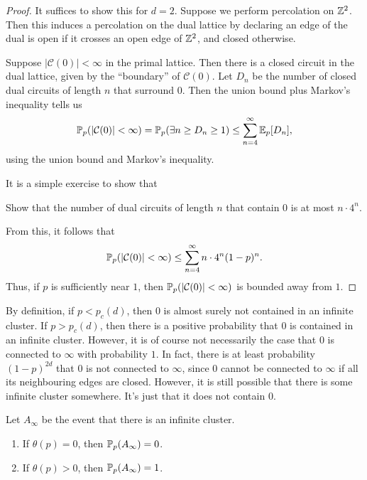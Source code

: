 \documentclass[a4paper]{article}
\begin{document}
\begin{proof}
  It suffices to show this for $d = 2$. Suppose we perform percolation on $\Z^2$. Then this induces a percolation on the dual lattice by declaring an edge of the dual is open if it crosses an open edge of $\Z^2$, and closed otherwise.

  Suppose $|\mathcal{C}(0)| < \infty$ in the primal lattice. Then there is a closed circuit in the dual lattice, given by the ``boundary'' of $\mathcal{C}(0)$. Let $D_n$ be the number of closed dual circuits of length $n$ that surround $0$. Then the union bound plus Markov's inequality tells us
  \[
    \P_p(|\mathcal{C}(0)| < \infty) = \P_p(\exists n \geq D_n \geq 1) \leq \sum_{n = 4}^\infty \E_p[D_n],
  \]
  using the union bound and Markov's inequality.

  It is a simple exercise to show that
  \begin{ex}
    Show that the number of dual circuits of length $n$ that contain $0$ is at most $n \cdot 4^n$.
  \end{ex}
  From this, it follows that
  \[
    \P_p(|\mathcal{C}(0)| < \infty) \leq \sum_{n = 4}^\infty n \cdot 4^n (1 - p)^n.
  \]
  Thus, if $p$ is sufficiently near $1$, then $\P_p(|\mathcal{C}(0)| < \infty)$ is bounded away from $1$.
\end{proof}

By definition, if $p < p_c(d)$, then $0$ is almost surely not contained in an infinite cluster. If $p > p_c(d)$, then there is a positive probability that $0$ is contained in an infinite cluster. However, it is of course not necessarily the case that $0$ is connected to $\infty$ with probability $1$. In fact, there is at least probability $(1 - p)^{2d}$ that $0$ is not connected to $\infty$, since $0$ cannot be connected to $\infty$ if all its neighbouring edges are closed. However, it is still possible that there is some infinite cluster somewhere. It's just that it does not contain $0$.

\begin{prop}
  Let $A_\infty$ be the event that there is an infinite cluster.
  \begin{enumerate}
    \item If $\theta(p) = 0$, then $\P_p(A_\infty) = 0$.
    \item If $\theta(p) > 0$, then $\P_p(A_\infty) = 1$.
  \end{enumerate}
\end{prop}
\end{document}
